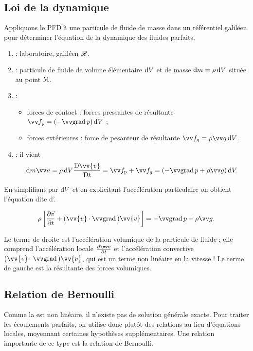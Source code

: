 \documentclass[12pt,fancy]{cours}
\begin{document}
\subsection{Loi de la dynamique}


Appliquons le PFD à une particule de fluide de masse dans un référentiel galiléen pour déterminer l'équation de la dynamique des fluides parfaits.
\begin{enumerate}
  \item {} : laboratoire, galiléen $\mathcal{R}$.
  \item {} : particule de fluide de volume élémentaire $\mathrm{d} V$ et de masse $\mathrm{d} m = \rho\, \mathrm{d} V$ située au point $\rm M$.
  \item {} :
  \begin{itemize}
    \item forces de contact : forces pressantes de résultante $\Vec{f_{\rm p}} = (-\grad{p}) \,\d V$ ;
    \item forces extérieures : force de pesanteur de résultante $\Vec{f_{g}} = \rho \Vec{g} \,\d V$.
  \end{itemize}
  \item {} : il vient
  \begin{equation}
    \d m \Vec{a} = \rho\,\d V\Dt{\vv{v}} = \Vec{f_{\rm p}} + \Vec{f_{g}} = \left(-\grad{p} + \rho \Vec{g}\right)\d V.
  \end{equation}
\end{enumerate}
En simplifiant par $\mathrm{d} V$ et en explicitant l'accélération particulaire on obtient l'équation dite d'.
\begin{theorem}\label{form:Euler}
  $$\rho\left[ \dfrac{\partial \vec{v}}{\partial t}+(\vv{v}\cdot\Grad{})\vv{v}\right]=-\grad{p}+\rho  \Vec{g}.$$
\end{theorem}
 
Le terme de droite est l’accélération volumique de la particule de fluide ; elle comprend l’accélération locale $\dr{\Vec{v}}{t}$ et l’accélération convective $(\vv{v}\cdot\Grad{})\vv{v}$, qui est un terme non linéaire en la vitesse ! Le terme de gauche est la résultante des forces volumiques.

\subsection{Relation de Bernoulli}
Comme la  est non linéaire, il n'existe pas de solution générale exacte. Pour traiter les écoulements parfaits, on utilise donc plutôt des relations  au lieu d'équations locales, moyennant certaines hypothèses supplémentaires. Une relation importante de ce type est la relation de Bernoulli.
\end{document}
